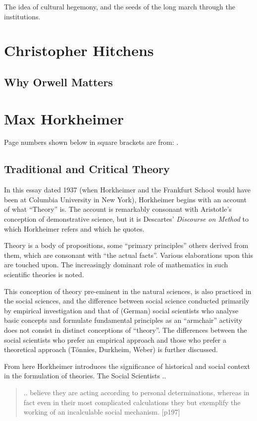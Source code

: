 \documentclass[10pt,titlepage]{book}
\begin{document}
The idea of cultural hegemony, and the seeds of the long march through the institutions.

\section{Christopher Hitchens}

\subsection{Why Orwell Matters\cite{hitchens-wom}}

\section{Max Horkheimer}

Page numbers shown below in square brackets are from: \cite{horkheimer-crit}.

\subsection{Traditional and Critical Theory}

In this essay \cite{horkheimer-trad, horkheimer-crit} dated 1937 (when Horkheimer and the Frankfurt School would have been at Columbia University in New York), Horkheimer begins with an account of what ``Theory'' is.
The account is remarkably consonant with Aristotle's conception of demonstrative science, but it is Descartes' \emph{Discourse on Method}\cite{descartesDOM} to which Horkheimer refers and which he quotes.

Theory is a body of propositions, some ``primary principles'' others derived from them, which are consonant with ``the actual facts''.
Various elaborations upon this are touched upon.
The increasingly dominant role of mathematics in such scientific theories is noted.

This conception of theory pre-eminent in the natural sciences, is also practiced in the social sciences, and the difference between social science conducted primarily by empirical investigation and that of (German) social scientists who analyse basic concepts and formulate fundamental principles as an ``armchair'' activity does not consist in distinct conceptions of ``theory''.
The differences between the social scientists who prefer an empirical approach and those who prefer a theoretical approach (T\"{o}nnies, Durkheim, Weber) is further discussed.

From here Horkheimer introduces the significance of historical and social context in the formulation of theories.
The Social Scientists ..
\begin{quote}
.. believe they are acting according to personal
determinations, whereas in fact even in their most complicated
calculations they but exemplify the working of an incalculable
social mechanism. [p197]
\end{quote}
\end{document}
